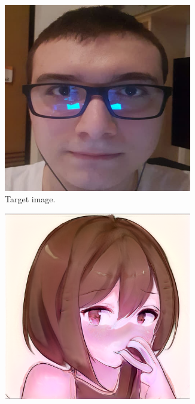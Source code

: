 \documentclass[conference]{IEEEtran}
\theoremstyle{definition}
\theoremstyle{remark}
\theoremstyle{remark}
\begin{document}
\begin{figure}
  \centering
  \begin{subfigure}[b]{0.15\textwidth}
    \centering \includegraphics[width=0.9\textwidth]{figs/anime-js-0.png}
    \caption{Target image.}
  \end{subfigure}
  \begin{subfigure}[b]{0.15\textwidth}
    \centering \includegraphics[width=0.9\textwidth]{figs/anime-js-1.png}

\end{subfigure}
\end{figure}
\end{document}
